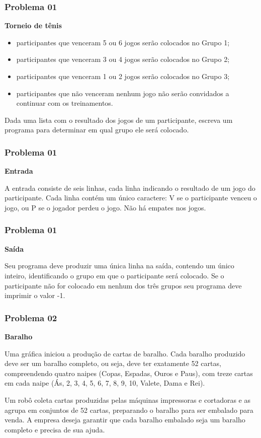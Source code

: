 \documentclass{beamer}
\begin{document}
\begin{frame}
\frametitle{Problema 01}

\textbf{Torneio de tênis}\vspace{0.2cm}
\begin{itemize}
    \item participantes que venceram 5 ou 6 jogos serão colocados no Grupo 1; 
    \item participantes que venceram 3 ou 4 jogos serão colocados no Grupo 2; 
    \item participantes que venceram 1 ou 2 jogos serão colocados no Grupo 3; 
    \item participantes que não venceram nenhum jogo não serão convidados a continuar com os treinamentos. 
\end{itemize}
Dada uma lista com o resultado dos jogos de um participante, escreva um programa para determinar em qual grupo ele será colocado. 
\end{frame}

\begin{frame}
\frametitle{Problema 01}
\textbf{Entrada}\vspace{0.2cm}

A entrada consiste de seis linhas, cada linha indicando o resultado de um jogo do participante. Cada linha contém um único caractere: V se o participante venceu o jogo, ou P se o jogador perdeu o jogo. Não há empates nos jogos.
\end{frame}


\begin{frame}
\frametitle{Problema 01}
\textbf{Saída}\vspace{0.2cm}

Seu programa deve produzir uma única linha na saída, contendo um único inteiro, identificando o grupo em que o participante será colocado. Se o participante não for colocado em nenhum dos três grupos seu programa deve imprimir o valor -1. 

\end{frame}

\begin{frame}
\frametitle{Problema 02}
\textbf{Baralho}\vspace{0.2cm}

Uma gráfica iniciou a produção de cartas de baralho. Cada baralho produzido deve ser um baralho completo, ou seja, deve ter exatamente 52 cartas, compreendendo quatro naipes (Copas, Espadas, Ouros e Paus), com treze cartas em cada naipe (Ás, 2, 3, 4, 5, 6, 7, 8, 9, 10, Valete, Dama e Rei).

Um robô coleta cartas produzidas pelas máquinas impressoras e cortadoras e as agrupa em conjuntos de 52 cartas, preparando o baralho para ser embalado para venda. A empresa deseja garantir que cada baralho embalado seja um baralho completo e precisa de sua ajuda.

\end{frame}
\end{document}
